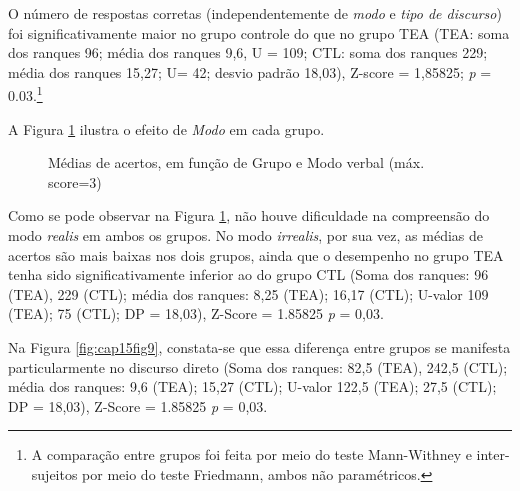 \documentclass[output=paper,colorlinks,citecolor=brown,booklanguage=portuguese]{langscibook}
\begin{document}
O número de respostas corretas (independentemente de \emph{modo} e \emph{tipo de discurso}) foi significativamente maior no grupo controle do que no grupo TEA (TEA: soma dos ranques 96; média dos ranques 9,6, U = 109; CTL: soma dos ranques 229; média dos ranques 15,27; U= 42; desvio padrão 18,03), Z-score = 1,85825;  \emph{p} = 0.03.\footnote{A comparação entre grupos foi feita por meio do teste Mann-Withney e inter-sujeitos por meio do teste Friedmann, ambos não paramétricos.  } 

A Figura \ref{fig:cap15fig8} ilustra o efeito de \emph{Modo} em cada grupo.


\begin{figure}[t]
\dataset
{}
    \caption{{Médias de acertos, em função de Grupo e Modo verbal (máx. score=3)}}
    \label{fig:cap15fig8}
\end{figure}




Como se pode observar na Figura \ref{fig:cap15fig8}, não houve dificuldade na compreensão do modo \emph{realis} em ambos os grupos. No modo \emph{irrealis}, por sua vez, as médias de acertos são mais baixas nos dois grupos, ainda que o desempenho no grupo TEA tenha sido significativamente inferior ao do grupo CTL (Soma dos ranques: 96 (TEA), 229 (CTL); média dos ranques: 8,25 (TEA); 16,17 (CTL); U-valor 109 (TEA); 75 (CTL); DP = 18,03), Z-Score = 1.85825 \emph{p} = 0,03. 

Na Figura \ref{fig:cap15fig9}, constata-se que essa diferença entre grupos se manifesta particularmente no discurso direto (Soma dos ranques: 82,5 (TEA), 242,5 (CTL); média dos ranques: 9,6 (TEA); 15,27 (CTL); U-valor 122,5 (TEA); 27,5 (CTL); DP = 18,03), Z-Score = 1.85825 \emph{p} = 0,03. 
\end{document}
